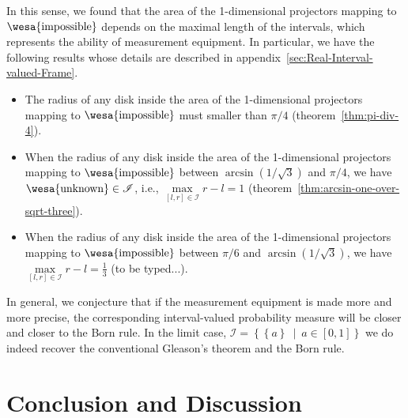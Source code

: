 \documentclass[12pt]{iopart}
\theoremstyle{remark}
\newcommand{\imposs}{{\mbox{\wesa{impossible}}}}
\newcommand{\unknown}{{\mbox{\wesa{unknown}}}}
\newcommand{\set}[2]{\ensuremath{\left\{ {#1}~\middle|~{#2}\right\} }}
\begin{document}
In this sense, we found that the area of the 1-dimensional projectors
mapping to $\imposs$ depends on the maximal length of the intervals,
which represents the ability of measurement equipment. In particular,
we have the following results whose details are described in appendix~\ref{sec:Real-Interval-valued-Frame}.
\begin{itemize}
\item The radius of any disk inside the area of the 1-dimensional projectors
mapping to $\imposs$ must smaller than $\pi / 4$ (theorem~\ref{thm:pi-div-4}).
\item When the radius of any disk inside the area of the 1-dimensional projectors
mapping to $\imposs$ between $\arcsin\left(1 / \sqrt{3}\right)$
and $\pi / 4$, we have $\unknown\in\mathscr{I}$, i.e., $\underset{\left[l,r\right]\in\mathscr{I}}{\max}r-l=1$
(theorem~\ref{thm:arcsin-one-over-sqrt-three}).
\item When the radius of any disk inside the area of the 1-dimensional projectors
mapping to $\imposs$ between $\pi/6$ and $\arcsin\left(1 / \sqrt{3}\right)$,
we have $\underset{\left[l,r\right]\in\mathscr{I}}{\max}r-l=\frac{1}{3}$
(to be typed...).
\end{itemize}
In general, we conjecture that if the measurement equipment is made
more and more precise, the corresponding interval-valued probability
measure will be closer and closer to the Born rule. In the limit case,
$\mathscr{I}=\set{\left\{ a\right\} }{a\in\left[0,1\right]}$ we do
indeed recover the conventional Gleason's theorem and the Born rule.

\section{Conclusion and Discussion}
\end{document}
